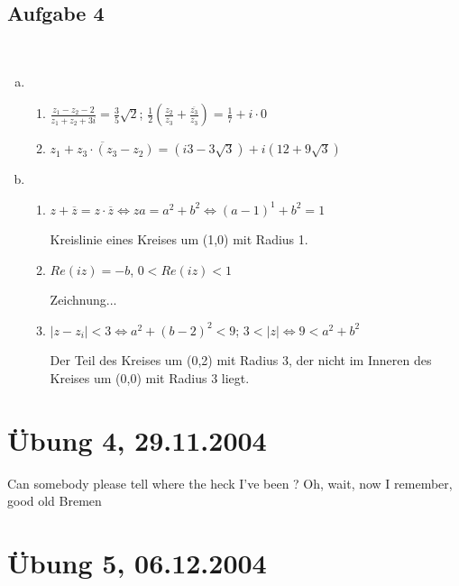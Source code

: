\documentclass[a4paper,twoside,DIV15,BCOR12mm]{scrbook}
\newcommand{\enue}{\ \begin{enumerate}[(1)]}
\newcommand{\enua}{\ \begin{enumerate}[a)]}
\newcommand{\une}{\end{enumerate}}
\newcommand{\LRA}{\Leftrightarrow}
\newcommand{\x}{\cdot}
\begin{document}
\subsection{Aufgabe 4}
\enua
\item
\enue
\item $\frac{z_1-z_2-2}{z_1+z_2+3i}=\frac35\sqrt2$; $\frac12(\frac{z_2}{z_3}+\frac{\overline{z_3}}{z_3})=\frac17+i\x0$
\item $\overline{z_1+z_3\x(z_3-z_2)}=(i3-3\sqrt3)+i(12+9\sqrt3)$
\une
\item
\enue
\item
  $z+\overline z = z\x\overline z\LRA za = a^2 + b^2 \LRA (a-1)^1+b^2=1$\par
  Kreislinie eines Kreises um (1,0) mit Radius 1.
\item
  $Re(iz)=-b$, $0<Re(iz)<1$\par Zeichnung...
\item
  $|z-z_i|<3\LRA a^2+(b-2)^2<9$; $3<|z|\LRA 9<a^2+b^2$\par
  Der Teil des Kreises um (0,2) mit Radius 3, der nicht im Inneren des Kreises um (0,0) mit Radius 3 liegt.
\une
\une

\section {Übung 4, 29.11.2004}
Can somebody please tell where the heck I've been ? Oh, wait, now I remember, good old Bremen
\section {Übung 5, 06.12.2004}
\end{document}
